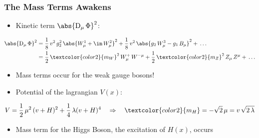 \documentclass[xcolor={usenames,dvipsnames,svgnames,table}]{beamer}
\begin{document}
\begin{frame}
    \frametitle{The Mass Terms Awakens}
    \begin{itemize}
        \item Kinetic term $\abs{\mathrm{D}\xspace_\mu \, \Phi}^2$:
    \end{itemize}
    \begin{align*}
        \abs{\mathrm{D}\xspace_\mu \, \Phi}^2 &= \frac 1 8 \, v^2 \, g_2^2 \, \abs{W_\mu^1 + \im \, W_\mu^2}^2 + \frac 1 8 \, v^2 \, \abs{g_2 \, W_\mu^3 - g_1 \, B_\mu}^2 + \, \ldots \\
        &= \frac 1 2 \, \textcolor{color2}{m_W}^2 \, W_\mu^+ \, W^{- \mu} + \frac 1 2 \, \textcolor{color2}{m_Z}^2 \, Z_\mu \, Z^\mu + \, \ldots
    \end{align*}
    \begin{itemize}
        \item \textcolor{color2}{Mass} terms occur for the weak gauge bosons!
        \item Potential of the lagrangian $V(x)$:
    \end{itemize}
    \begin{gather*}
        V = \frac 1 2 \, \mu^2 \, (v+H)^2 + \frac 1 4 \, \lambda (v+H)^4 \quad \Rightarrow \quad \textcolor{color2}{m_H} = -\sqrt 2 \, \mu = v \, \sqrt{2 \, \lambda}
    \end{gather*}
    \begin{itemize}
        \item \textcolor{color2}{Mass} term for the Higgs Boson, the excitation of $H(x)$, occurs
    \end{itemize}
\end{frame}
\end{document}
